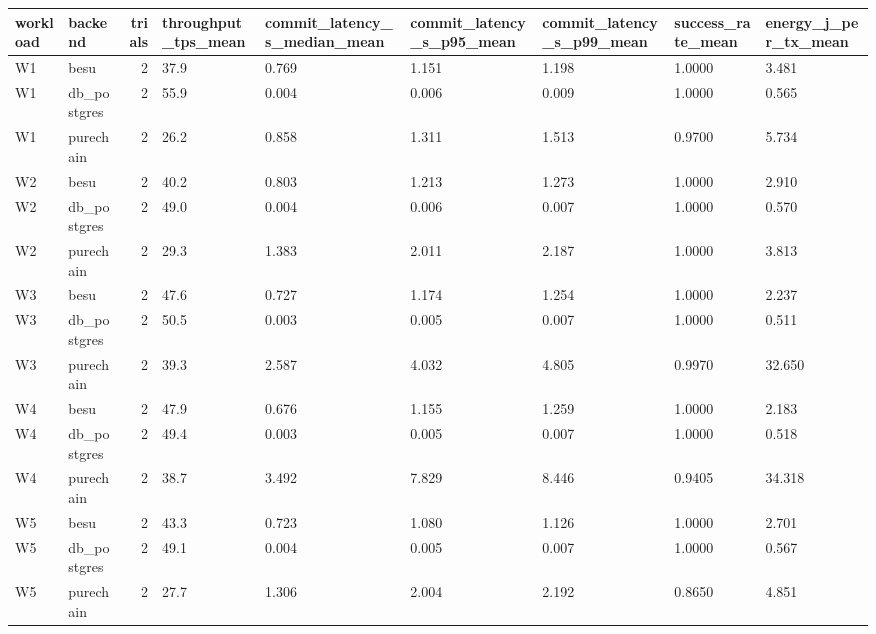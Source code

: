 \begin{tabular}{llrllllll}
\toprule
workload & backend & trials & throughput\_tps\_mean & commit\_latency\_s\_median\_mean & commit\_latency\_s\_p95\_mean & commit\_latency\_s\_p99\_mean & success\_rate\_mean & energy\_j\_per\_tx\_mean \\
\midrule
W1 & besu & 2 & 37.9 & 0.769 & 1.151 & 1.198 & 1.0000 & 3.481 \\
W1 & db\_postgres & 2 & 55.9 & 0.004 & 0.006 & 0.009 & 1.0000 & 0.565 \\
W1 & purechain & 2 & 26.2 & 0.858 & 1.311 & 1.513 & 0.9700 & 5.734 \\
W2 & besu & 2 & 40.2 & 0.803 & 1.213 & 1.273 & 1.0000 & 2.910 \\
W2 & db\_postgres & 2 & 49.0 & 0.004 & 0.006 & 0.007 & 1.0000 & 0.570 \\
W2 & purechain & 2 & 29.3 & 1.383 & 2.011 & 2.187 & 1.0000 & 3.813 \\
W3 & besu & 2 & 47.6 & 0.727 & 1.174 & 1.254 & 1.0000 & 2.237 \\
W3 & db\_postgres & 2 & 50.5 & 0.003 & 0.005 & 0.007 & 1.0000 & 0.511 \\
W3 & purechain & 2 & 39.3 & 2.587 & 4.032 & 4.805 & 0.9970 & 32.650 \\
W4 & besu & 2 & 47.9 & 0.676 & 1.155 & 1.259 & 1.0000 & 2.183 \\
W4 & db\_postgres & 2 & 49.4 & 0.003 & 0.005 & 0.007 & 1.0000 & 0.518 \\
W4 & purechain & 2 & 38.7 & 3.492 & 7.829 & 8.446 & 0.9405 & 34.318 \\
W5 & besu & 2 & 43.3 & 0.723 & 1.080 & 1.126 & 1.0000 & 2.701 \\
W5 & db\_postgres & 2 & 49.1 & 0.004 & 0.005 & 0.007 & 1.0000 & 0.567 \\
W5 & purechain & 2 & 27.7 & 1.306 & 2.004 & 2.192 & 0.8650 & 4.851 \\
\bottomrule
\end{tabular}
